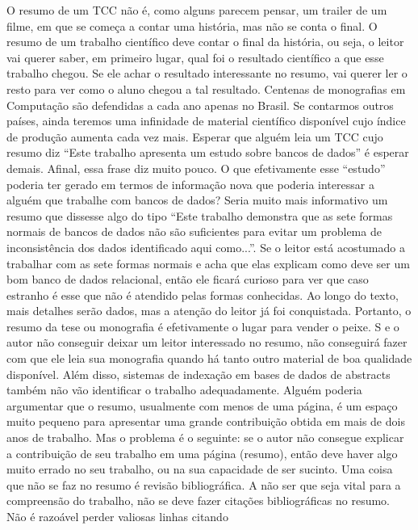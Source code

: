\documentclass[
	12pt,				%
    oneside,			%
	a4paper,			%
	english,			%
	french,				%
	spanish,			%
	brazil,				%
	]{abntex2}
\begin{document}
\begin{resumo} %
 O resumo de um TCC não é, como alguns parecem pensar, um trailer de um filme, em que se começa a
 contar uma história, mas não se conta o final. O resumo de um trabalho científico deve contar o final da
 história, ou seja, o leitor vai querer saber, em primeiro lugar, qual foi o resultado científico a que esse trabalho
 chegou. Se ele achar o resultado interessante no resumo, vai querer ler o resto para ver como o aluno chegou a
 tal resultado.
 Centenas de monografias em Computação são defendidas a cada ano apenas no Brasil. Se contarmos outros
 países, ainda teremos uma infinidade de material científico disponível cujo índice de produção aumenta cada
 vez mais. Esperar que alguém leia um TCC cujo resumo diz “Este trabalho apresenta um estudo sobre
 bancos de dados” é esperar demais. Afinal, essa frase diz muito pouco. O que efetivamente esse “estudo”
 poderia ter gerado em termos de informação nova que poderia interessar a alguém que trabalhe com bancos de
 dados?
 Seria muito mais informativo um resumo que dissesse algo do tipo “Este trabalho demonstra que as sete
 formas normais de bancos de dados não são suficientes para evitar um problema de inconsistência dos dados
 identificado aqui como...”. Se o leitor está acostumado a trabalhar com as sete formas normais e acha que elas
 explicam como deve ser um bom banco de dados relacional, então ele ficará curioso para ver que caso estranho
 é esse que não é atendido pelas formas conhecidas. Ao longo do texto, mais detalhes serão dados, mas a
 atenção do leitor já foi conquistada.
 Portanto, o resumo da tese ou monografia é efetivamente o lugar para vender o peixe. S e o autor não
 conseguir deixar um leitor interessado no resumo, não conseguirá fazer com que ele leia sua monografia
 quando há tanto outro material de boa qualidade disponível. Além disso, sistemas de indexação em bases de
 dados de abstracts também não vão identificar o trabalho adequadamente.
 Alguém poderia argumentar que o resumo, usualmente com menos de uma página, é um espaço muito
 pequeno para apresentar uma grande contribuição obtida em mais de dois anos de trabalho. Mas o problema é
 o seguinte: se o autor não consegue explicar a contribuição de seu trabalho em uma página (resumo), então
 deve haver algo muito errado no seu trabalho, ou na sua capacidade de ser sucinto.
 Uma coisa que não se faz no resumo é revisão bibliográfica. A não ser que seja vital para a compreensão do
 trabalho, não se deve fazer citações bibliográficas no resumo. Não é razoável perder valiosas linhas citando

\end{resumo}
\end{document}
